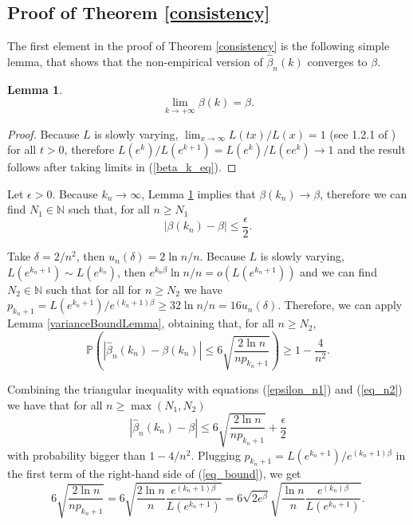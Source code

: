 \documentclass[sn-mathphys-ay]{sn-jnl}%
\newtheorem{lemma}{Lemma}[section]
\newcommand{\N}{\mathbb{N}}
\renewcommand{\P}{\mathbb{P}}
\begin{document}
\begin{appendices}
\subsection{Proof of Theorem \ref{consistency}}

The first element in the proof of Theorem \ref{consistency} is the following simple
lemma, that shows that the non-empirical version of $\widehat{\beta}_n(k)$ converges
to $\beta$.

\begin{lemma}\label{limit_alpha}
    \begin{equation*}
        \lim_{k\to +\infty}{\beta(k)}=\beta.
    \end{equation*}
\end{lemma}
\begin{proof}
    Because \(L\) is slowly varying, \(\lim_{x\to\infty}{L(t x)}/{L(x)}=1\)
    (see 1.2.1 of \cite{Bingham1987}) for all \(t>0\), therefore
    \({L(e^{k})}/{L(e^{k+1})}={L(e^{k})}/{L(ee^k)}\to 1\) and the result
    follows after taking limits in (\ref{beta_k_eq}).
\end{proof}

Let \(\epsilon>0\). Because \(k_n\to\infty\), Lemma \ref{limit_alpha} implies that
\(\beta(k_n)\to\beta\), therefore we can find \(N_1\in\N\) such that, for all $n\geq
    N_1$
\begin{equation}\label{epsilon_n1}
    \left|\beta(k_n)-\beta\right|\leq \frac{\epsilon}{2}.
\end{equation}

Take \(\delta = {2}/{n^2}\), then \(u_n(\delta)={2\ln{n}}/{n}\). Because \(L\) is
slowly varying, \(L\left(e^{k_n+1}\right)\sim L\left(e^{k_n}\right)\), then
\(e^{k_n\beta}{\ln{n}}/{n}=o\left(L\left(e^{k_n+1}\right)\right)\) and we can find
\(N_2\in\N\) such that for all for $n\geq N_2$ we have
\(p_{k_n+1}={L(e^{k_n+1})}/{e^{(k_n+1)\beta}}\geq {32\ln{n}}/{n}=16u_n(\delta)\).
Therefore, we can apply Lemma \ref{varianceBoundLemma}, obtaining that, for all
$n\geq N_2$,
\begin{equation}\label{eq_n2}
    \P\left(\left|\widehat{\beta}_n(k_n)-\beta(k_n)\right|\leq 6\sqrt{\frac{2\ln{n}}{np_{k_n+1}}}\right)\geq 1-\frac{4}{n^2}.
\end{equation}

Combining the triangular inequality with equations (\ref{epsilon_n1}) and
(\ref{eq_n2}) we have that for all \(n\geq\max\left(N_1,N_2\right)\)
\begin{equation}\label{eq_bound}
    \left|\widehat{\beta}_n{(k_n)}-\beta\right| \leq 6\sqrt{\frac{2\ln{n}}{np_{k_n+1}}}+\frac{\epsilon}{2}
\end{equation}
with probability bigger than \(1-{4}/{n^2}\). Plugging
\(p_{k_n+1}={L(e^{k_n+1})}/{e^{(k_n+1)\beta}}\) in the first term of the
right-hand side of (\ref{eq_bound}), we get
\begin{equation*}
    6\sqrt{\frac{2\ln{n}}{np_{k_n+1}}}=6\sqrt{\frac{2\ln{n}}{n}\frac{e^{(k_n+1)\beta}}{L(e^{k_n+1})}}=6\sqrt{2e^{\beta}}\sqrt{\frac{\ln{n}}{n}\frac{e^{(k_n)\beta}}{L(e^{k_n+1})}}.
\end{equation*}


\end{appendices}
\end{document}
